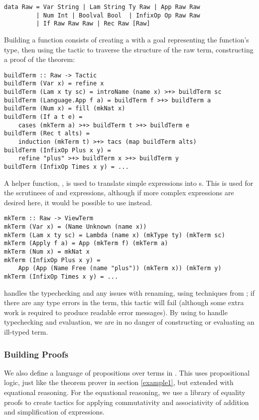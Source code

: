 \begin{verbatim}
data Raw = Var String | Lam String Ty Raw | App Raw Raw
         | Num Int | Boolval Bool  | InfixOp Op Raw Raw
         | If Raw Raw Raw | Rec Raw [Raw]
\end{verbatim}

Building a \Funl{} function consists of creating a  
with a goal representing the function's type, then using the
 tactic to traverse the
structure of the raw term, constructing a proof of the
theorem:

\begin{verbatim}
buildTerm :: Raw -> Tactic
buildTerm (Var x) = refine x
buildTerm (Lam x ty sc) = introName (name x) >+> buildTerm sc
buildTerm (Language.App f a) = buildTerm f >+> buildTerm a
buildTerm (Num x) = fill (mkNat x)
buildTerm (If a t e) = 
    cases (mkTerm a) >+> buildTerm t >+> buildTerm e
buildTerm (Rec t alts) =
    induction (mkTerm t) >+> tacs (map buildTerm alts)
buildTerm (InfixOp Plus x y) = 
    refine "plus" >+> buildTerm x >+> buildTerm y
buildTerm (InfixOp Times x y) = ...
\end{verbatim}

A helper function, , is used to translate simple
expressions into s. This is used for the scrutinees of
 and  expressions, although if more complex
expressions are desired here, it would be possible to use
 instead.

\begin{verbatim}
mkTerm :: Raw -> ViewTerm
mkTerm (Var x) = (Name Unknown (name x))
mkTerm (Lam x ty sc) = Lambda (name x) (mkType ty) (mkTerm sc)
mkTerm (Apply f a) = App (mkTerm f) (mkTerm a)
mkTerm (Num x) = mkNat x
mkTerm (InfixOp Plus x y) = 
    App (App (Name Free (name "plus")) (mkTerm x)) (mkTerm y)
mkTerm (InfixOp Times x y) = ...
\end{verbatim}

\Ivor{} handles
the typechecking and any issues with renaming, using techniques from
\cite{not-a-number}; if there are any type errors in the 
term, this tactic will fail (although some extra work is required to
produce readable error messages). By using \Ivor{} to handle
typechecking and evaluation, we are in no danger of constructing or 
evaluating an ill-typed term.


\subsubsection{Building Proofs}
We also define a language of propositions over terms in \Funl{}.
This uses propositional logic, just like the theorem prover in
section \ref{example1}, but extended with equational reasoning. For
the equational reasoning, we use a library of equality proofs to
create tactics for applying commutativity and associativity of
addition and simplification of expressions.

